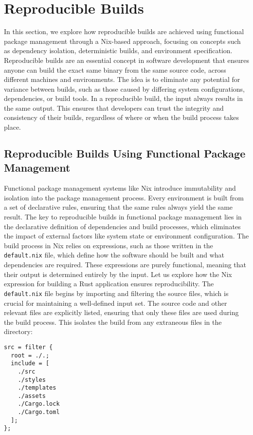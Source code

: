 \section{Reproducible Builds}

In this section, we explore how reproducible builds are achieved
using functional package management
through a Nix-based approach, focusing on concepts such as dependency isolation,
deterministic builds, and environment specification.
Reproducible builds are an essential concept in software development that ensures
anyone can build the exact same binary from the same source code, across different
machines and environments. The idea is to eliminate any potential for variance
between builds, such as those caused by differing system configurations, dependencies,
or build tools. In a reproducible build, the input always results in the same output.
This ensures that developers can trust the integrity and consistency of their builds,
regardless of where or when the build process takes place.

\subsection{Reproducible Builds Using Functional Package Management}

Functional package management systems like Nix introduce immutability and isolation
into the package management process. Every environment is built from a set of
declarative rules, ensuring that the same rules always yield the same result.
The key to reproducible builds in functional package management lies in the
declarative definition of dependencies and build processes, which eliminates
the impact of external factors like system state or environment configuration.
The build process in Nix relies on expressions, such as those written in the
\texttt{default.nix} file, which define how the software should be built and what
dependencies are required. These expressions are purely functional, meaning that
their output is determined entirely by the input. Let us explore how the Nix
expression for building a Rust application ensures reproducibility.
The \texttt{default.nix} file begins by importing and filtering the source files,
which is crucial for maintaining a well-defined input set. The source code and
other relevant files are explicitly listed, ensuring that only these files are
used during the build process. This isolates the build from any extraneous files
in the directory:

\begin{lstlisting}[caption={Source filtering in Nix}]
src = filter {
  root = ./.;
  include = [
    ./src
    ./styles
    ./templates
    ./assets
    ./Cargo.lock
    ./Cargo.toml
  ];
};
\end{lstlisting}

